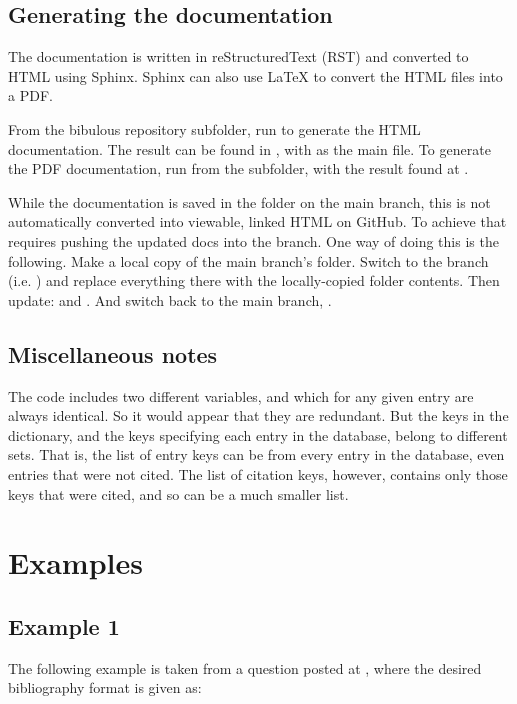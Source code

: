 \documentclass[letterpaper,10pt,english]{sphinxmanual}
\begin{document}
\section{Generating the documentation}
\label{developer_guide:generating-the-documentation}
The documentation is written in reStructuredText (RST) and converted to HTML using Sphinx. Sphinx can also use LaTeX to convert the HTML files into a PDF.

From the bibulous repository  subfolder, run  to generate the HTML documentation. The result can be found in , with  as the main file. To generate the PDF documentation, run  from the  subfolder, with the result found at .

While the documentation is saved in the  folder on the main branch, this is not automatically converted into viewable, linked HTML on GitHub. To achieve that requires pushing the updated docs into the  branch. One way of doing this is the following. Make a local copy of the main branch's  folder. Switch to the  branch (i.e. ) and replace everything there with the locally-copied  folder contents. Then update:  and . And switch back to the main branch, .


\section{Miscellaneous notes}
\label{developer_guide:miscellaneous-notes}
The code includes two different variables,  and  which for any given entry are always identical. So it would appear that they are redundant. But the keys in the  dictionary, and the keys specifying each entry in the database, belong to different sets. That is, the list of entry keys can be from every entry in the database, even entries that were not cited. The list of citation keys, however, contains only those keys that were cited, and so can be a much smaller list.


\chapter{Examples}
\label{examples::doc}\label{examples:examples}

\section{Example 1}
\label{examples:example-1}
The following example is taken from a question posted at , where the desired bibliography format is given as:
\end{document}
